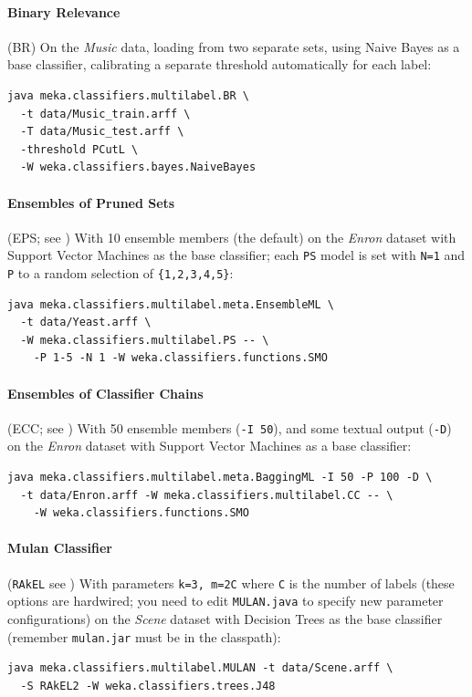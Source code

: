 \documentclass[11pt]{article}
\begin{document}
\paragraph{Binary Relevance} (BR) On the \textit{Music} data, loading from two separate sets, using Naive Bayes as a base classifier, calibrating a separate threshold automatically for each label: 
\begin{lstlisting}
java meka.classifiers.multilabel.BR \
  -t data/Music_train.arff \
  -T data/Music_test.arff \
  -threshold PCutL \
  -W weka.classifiers.bayes.NaiveBayes
\end{lstlisting}

\paragraph{Ensembles of Pruned Sets} (EPS; see \cite{EPS}) With 10 ensemble members (the default) on the \textit{Enron} dataset with Support Vector Machines as the base classifier; each \texttt{PS} model is set with \texttt{N=1} and \texttt{P} to a random selection of \texttt{\{1,2,3,4,5\}}:

\begin{lstlisting}
java meka.classifiers.multilabel.meta.EnsembleML \
  -t data/Yeast.arff \
  -W meka.classifiers.multilabel.PS -- \
    -P 1-5 -N 1 -W weka.classifiers.functions.SMO
\end{lstlisting}

\paragraph{Ensembles of Classifier Chains} (ECC; see \cite{ECC2}) With 50 ensemble members (\texttt{-I 50}), and some textual output (\texttt{-D}) on the \textit{Enron} dataset with Support Vector Machines as a base classifier:
\begin{lstlisting}
java meka.classifiers.multilabel.meta.BaggingML -I 50 -P 100 -D \
  -t data/Enron.arff -W meka.classifiers.multilabel.CC -- \
    -W weka.classifiers.functions.SMO
\end{lstlisting}

\paragraph{Mulan Classifier} (\texttt{RAkEL} see \cite{RAKEL}) With parameters \texttt{\texttt{k=3}, \texttt{m=2C}} where \texttt{C} is the number of labels (these options are hardwired; you need to edit \texttt{MULAN.java} to specify new parameter configurations) on the \textit{Scene} dataset with Decision Trees as the base classifier (remember {\texttt{mulan.jar} must be in the classpath}):
\begin{lstlisting}
java meka.classifiers.multilabel.MULAN -t data/Scene.arff \ 
  -S RAkEL2 -W weka.classifiers.trees.J48
\end{lstlisting}
\end{document}
